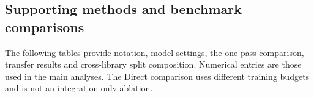 \documentclass[pdflatex,sn-mathphys-num]{sn-jnl}%
\theoremstyle{thmstyleone}%
\theoremstyle{thmstyletwo}%
\theoremstyle{thmstylethree}%
\begin{document}
\begin{appendices}
\renewcommand{\thefigure}{S\arabic{figure}}
\renewcommand{\thetable}{S\arabic{table}}
\renewcommand{\theHfigure}{supp.\arabic{figure}}
\renewcommand{\theHtable}{supp.\arabic{table}}
\setcounter{figure}{0}
\setcounter{table}{0}

\section{Supporting methods and benchmark comparisons}\label{app:supporting-tables}
The following tables provide notation, model settings, the one-pass comparison, transfer results and cross-library split composition. Numerical entries are those used in the main analyses. The Direct comparison uses different training budgets and is not an integration-only ablation.


\end{appendices}
\end{document}
